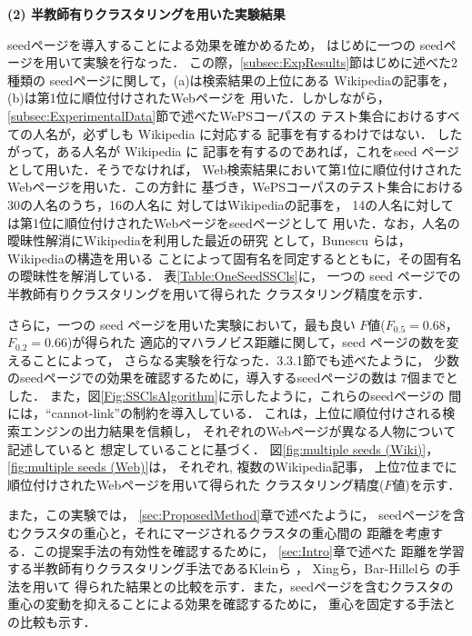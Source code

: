 \documentclass[japanese]{jnlp_1.4}
\begin{document}
\noindent
\textbf{(2) 半教師有りクラスタリングを用いた実験結果}

seedページを導入することによる効果を確かめるため，
はじめに一つの seedページを用いて実験を行なった．
この際，\ref{subsec:ExpResults}節はじめに述べた2種類の
seedページに関して，(a)は検索結果の上位にある
Wikipediaの記事を，(b)は第1位に順位付けされたWebページを
用いた．しかしながら，
\ref{subsec:ExperimentalData}節で述べたWePSコーパスの
テスト集合におけるすべての人名が，必ずしも Wikipedia に対応する
記事を有するわけではない．
したがって，ある人名が Wikipedia に
記事を有するのであれば，これをseed ページとして用いた．そうでなければ，
Web検索結果において第1位に順位付けされたWebページを用いた．この方針に
基づき，WePSコーパスのテスト集合における30の人名のうち，16の人名に
対してはWikipediaの記事を，
14の人名に対しては第1位に順位付けされたWebページをseedページとして
用いた．なお，人名の曖昧性解消にWikipediaを利用した最近の研究
として，Bunescu \cite{Bunescu06} らは，Wikipediaの構造を用いる
ことによって固有名を同定するとともに，その固有名の曖昧性を解消している．
表\ref{Table:OneSeedSSCls}に，
一つの seed ページでの半教師有りクラスタリングを用いて得られた
クラスタリング精度を示す．

\begin{table}[b]
\label{Table:OneSeedSSCls}

\end{table}

さらに，一つの seed ページを用いた実験において，最も良い
$F$値($F_{0.5}=0.68$，$F_{0.2}=0.66$)が得られた
適応的マハラノビス距離に関して，seed ページの数を変えることによって，
さらなる実験を行なった．3.3.1節でも述べたように，
少数のseedページでの効果を確認するために，導入するseedページの数は
7個までとした．
また，図\ref{Fig:SSClsAlgorithm}に示したように，これらのseedページの
間には，``cannot-link''の制約を導入している．
これは，上位に順位付けされる検索エンジンの出力結果を信頼し，
それぞれのWebページが異なる人物について記述していると
想定していることに基づく．
図\ref{fig:multiple seeds (Wiki)}，\ref{fig:multiple seeds (Web)}は，
それぞれ, 複数のWikipedia記事，
上位7位までに順位付けされたWebページを用いて得られた
クラスタリング精度($F$値)を示す．

また，この実験では，
\ref{sec:ProposedMethod}章で述べたように，
seedページを含むクラスタの重心と，それにマージされるクラスタの重心間の
距離を考慮する．この提案手法の有効性を確認するために，
\ref{sec:Intro}章で述べた
距離を学習する半教師有りクラスタリング手法であるKleinら \cite{Klein02}，
Xingら\cite{Xing03}，Bar-Hillelら\cite{Bar-Hillel03} の手法を用いて
得られた結果との比較を示す．また，seedページを含むクラスタの
重心の変動を抑えることによる効果を確認するために，
重心を固定する手法との比較も示す．
\end{document}
